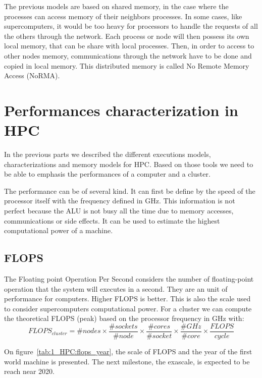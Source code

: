 The previous models are based on shared memory, in the case where the processes can access memory of their neighbors processes. 
In some cases, like supercomputers, it would be too heavy for processors to handle the requests of all the others through the network. 
Each process or node will then possess its own local memory, that can be share with local processes. 
Then, in order to access to other nodes memory, communications through the network have to be done and copied in local memory. 
This distributed memory is called No Remote Memory Access (NoRMA).

\section{Performances characterization in HPC}
In the previous parts we described the different executions models, characterizations and memory models for HPC. 
Based on those tools we need to be able to emphasis the performances of a computer and a cluster. 

The performance can be of several kind. 
It can first be define by the speed of the processor itself with the frequency defined in GHz. 
This information is not perfect because the ALU is not busy all the time due to memory accesses, communications or side effects. 
It can be used to estimate the highest computational power of a machine. 

\subsection{FLOPS}
The Floating point Operation Per Second considers the number of floating-point operation that the system will executes in a second. 
They are an unit of performance for computers. 
Higher FLOPS is better. 
This is also the scale used to consider supercomputers computational power. 
For a cluster we can compute the theoretical FLOPS (peak) based on the processor frequency in GHz with:
\begin{equation}
FLOPS_{cluster} = \#nodes \times \frac{\#sockets}{\#node} \times \frac{\#cores}{\#socket} \times \frac{\#GHz}{\#core} \times \frac{FLOPS}{cycle}
\end{equation}

On figure~\ref{tab:1_HPC:flops_year}, the scale of FLOPS and the year of the first world machine is presented.
The next milestone, the exascale, is expected to be reach near 2020.  

